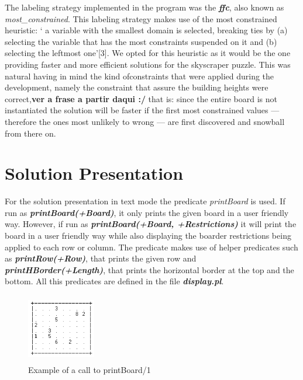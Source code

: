 \documentclass{llncs}
\begin{document}
The labeling strategy implemented in the program was the \textbf{\textit{ffc}}, also known as \textit{most\_constrained}. This labeling strategy makes use of the most constrained heuristic: ` a variable with the smallest domain is selected, breaking ties by (a) selecting the variable that has the most constraints suspended on it and (b) selecting the leftmost one'[3].  We opted for this heuristic as it would be the one providing faster and more efficient solutions for the skyscraper puzzle. This was natural having in mind the kind ofconstraints that were applied during the development, namely the constraint that assure the building heights were correct,\textbf{ver a frase a partir daqui :/} that is: since the entire board is not instantiated the solution will be faster if the first most constrained values --- therefore the ones most unlikely to wrong --- are first discovered and snowball from there on.

%
\section{Solution Presentation}

For the solution presentation in text mode the predicate \textit{printBoard} is used. If run as \textbf{\textit{printBoard(+Board)}}, it only prints the given board in a user friendly way. However, if run as \textbf{\textit{printBoard(+Board, +Restrictions)}} it will print the board in a user friendly way while also displaying the boarder restrictions being applied to each row or column. The predicate makes use of helper predicates such as \textbf{\textit{printRow(+Row)}}, that prints the given row and \textbf{\textit{printHBorder(+Length)}}, that prints the horizontal border at the top and the bottom. All this predicates are defined in the file \textbf{\textit{display.pl}}.

\begin{figure}[h!]
\begin{center}
\includegraphics[height=3cm,width=3cm]{images/printBoard1.png}
\caption{Example of a call to printBoard/1}
\label{Figure 3}
\end{center}
\end{figure}
\end{document}
